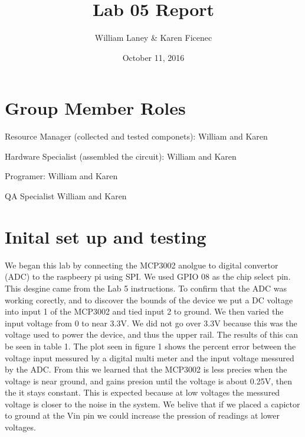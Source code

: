 \documentclass[prl,12pt,notitlepage,aps,onecolumn,superscriptaddress]{revtex4-1}
\begin{document}
\title{Lab 05 Report}
\author{William Laney \& Karen Ficenec}
\date{October 11, 2016}
\maketitle

\section{Group Member Roles}
Resource Manager (collected and tested componets): William and Karen

Hardware Specialist (assembled the circuit): William and Karen

Programer: William and Karen

QA Specialist William and Karen

\section{Inital set up and testing}
We began this lab by connecting the MCP3002 anolgue to digital convertor (ADC) to the raspbeery pi using SPI. We used GPIO 08 as the chip select pin. This desgine came from the Lab 5 instructions. To confirm that the ADC was working corectly, and to discover the bounds of the device we put a DC voltage into input 1 of the MCP3002 and tied input 2 to ground. We then varied the input voltage from 0 to near 3.3V. We did not go over 3.3V because this was the voltage used to power the device, and thus the upper rail. The results of this can be seen in table 1. The plot seen in figure 1 shows the percent error between the voltage input messured by a digital multi meter and the input voltage messured by the ADC. From this we learned that the MCP3002 is less precies when the voltage is near ground, and gains presion until the voltage is about 0.25V, then the it stays constant. This is expected because at low voltages the messured voltage is closer to the noise in the system. We belive that if we placed a capictor to ground at the Vin pin we could increase the pression of readings at lower voltages.
\end{document}
